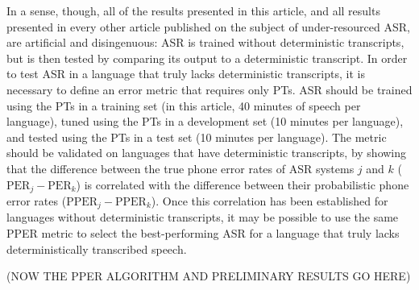 In a sense, though, all of the results presented in this article, and
all results presented in every other article published on the subject
of under-resourced ASR, are artificial and disingenuous: ASR is
trained without deterministic transcripts, but is then tested by
comparing its output to a deterministic transcript.  In order to test
ASR in a language that truly lacks deterministic transcripts, it is
necessary to define an error metric that requires only PTs.  ASR
should be trained using the PTs in a training set (in this article, 40
minutes of speech per language), tuned using the PTs in a development
set (10 minutes per language), and tested using the PTs in a test set
(10 minutes per language).  The metric should be validated on
languages that have deterministic transcripts, by showing that the
difference between the true phone error rates of ASR systems $j$ and
$k$ ($\mbox{PER}_j-\mbox{PER}_k$) is correlated with the difference
between their probabilistic phone error rates
($\mbox{PPER}_j-\mbox{PPER}_k$).  Once this correlation has been
established for languages without deterministic transcripts, it may be
possible to use the same PPER metric to select the best-performing ASR
for a language that truly lacks deterministically transcribed speech.

(NOW THE PPER ALGORITHM AND PRELIMINARY RESULTS GO HERE)

